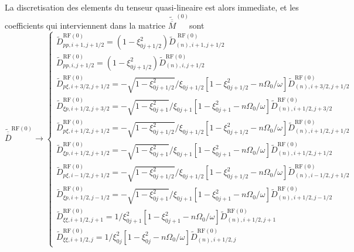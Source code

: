 La discretisation des elements du tenseur quasi-lineaire est alors
immediate, et les coefficients qui interviennent dans la matrice $\widetilde{\overline{\overline{M}}}^{\left(0\right)}$sont
\[
\widetilde{\overline{\overline{D}}}^{\text{RF}(0)}\rightarrow\left\{ \begin{array}{l}
\widetilde{D}_{pp,i+1,j+1/2}^{\text{RF}(0)}=(1-\xi_{0j+1/2}^{2})\widetilde{D}_{(n),i+1,j+1/2}^{\text{ RF}(0)}\\
\widetilde{D}_{pp,i,j+1/2}^{\text{RF}(0)}=(1-\xi_{0j+1/2}^{2})\widetilde{D}_{(n),i,j+1/2}^{\text{RF}(0)}\\
\widetilde{D}_{p\xi,i+3/2,j+1/2}^{\text{RF}\left(0\right)}=-\sqrt{1-\xi_{0j+1/2}^{2}}/\xi_{0j+1/2}\left[1-\xi_{0j+1/2}^{2}-n\Omega_{0}/\omega\right]\widetilde{D}_{(n),i+3/2,j+1/2}^{\text{RF}(0)}\\
\widetilde{D}_{\xi p,i+1/2,j+3/2}^{\text{RF}\left(0\right)}=-\sqrt{1-\xi_{0j+1}^{2}}/\xi_{0j+1}\left[1-\xi_{0j+1}^{2}-n\Omega_{0}/\omega\right]\widetilde{D}_{(n),i+1/2,j+3/2}^{\text{RF}(0)}\\
\widetilde{D}_{p\xi,i+1/2,j+1/2}^{\text{RF}\left(0\right)}=-\sqrt{1-\xi_{0j+1/2}^{2}}/\xi_{0j+1/2}\left[1-\xi_{0j+1/2}^{2}-n\Omega_{0}/\omega\right]\widetilde{D}_{(n),i+1/2,j+1/2}^{\text{RF}(0)}\\
\widetilde{D}_{\xi p,i+1/2,j+1/2}^{\text{RF}\left(0\right)}=-\sqrt{1-\xi_{0j+1}^{2}}/\xi_{0j+1}\left[1-\xi_{0j+1}^{2}-n\Omega_{0}/\omega\right]\widetilde{D}_{(n),i+1/2,j+1/2}^{\text{RF}(0)}\\
\widetilde{D}_{p\xi,i-1/2,j+1/2}^{\text{RF}\left(0\right)}=-\sqrt{1-\xi_{0j+1/2}^{2}}/\xi_{0j+1/2}\left[1-\xi_{0j+1/2}^{2}-n\Omega_{0}/\omega\right]\widetilde{D}_{(n),i-1/2,j+1/2}^{\text{RF}(0)}\\
\widetilde{D}_{\xi p,i+1/2,j-1/2}^{\text{RF}\left(0\right)}=-\sqrt{1-\xi_{0j+1}^{2}}/\xi_{0j+1}\left[1-\xi_{0j+1}^{2}-n\Omega_{0}/\omega\right]\widetilde{D}_{(n),i+1/2,j-1/2}^{\text{RF}(0)}\\
\widetilde{D}_{\xi\xi,i+1/2,j+1}^{\text{RF}(0)}=1/\xi_{0j+1}^{2}\left[1-\xi_{0j+1}^{2}-n\Omega_{0}/\omega\right]\widetilde{D}_{(n),i+1/2,j+1}^{\text{RF}(0)}\\
\widetilde{D}_{\xi\xi,i+1/2,j}^{\text{RF}(0)}=1/\xi_{0j}^{2}\left[1-\xi_{0j}^{2}-n\Omega_{0}/\omega\right]\widetilde{D}_{(n),i+1/2,j}^{\text{RF}(0)}\end{array}\right.\]
